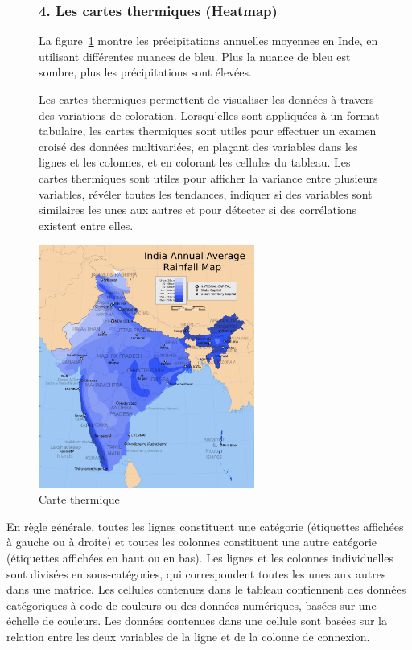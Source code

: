 \documentclass[french, a4paper, 12pt]{report}
\begin{document}
\begin{figure}[!htb]
\begin{minipage}{0.46\linewidth}

\subsubsection{4. Les cartes thermiques (Heatmap)}
La figure~\ref{fig:2.7} montre les précipitations annuelles moyennes en Inde, en utilisant différentes nuances de bleu. Plus la nuance de bleu est sombre, plus les précipitations sont élevées.

Les cartes thermiques permettent de visualiser les données à travers des variations de coloration. Lorsqu'elles sont appliquées à un format tabulaire, les cartes thermiques sont utiles pour effectuer un examen croisé des données multivariées, en plaçant des variables dans les lignes et les colonnes, et en colorant les cellules du tableau.
Les cartes thermiques sont utiles pour afficher la variance entre plusieurs variables, révéler toutes les tendances, indiquer si des variables sont similaires les unes aux autres et pour détecter si des corrélations existent entre elles.
\end{minipage}\hfil
\begin{minipage}{0.35\linewidth}
\centering
    \includegraphics[height=8cm]{images/Heatmap.png}
    \caption{Carte thermique \footnotemark}
 \label{fig:2.7}
\end{minipage}
\end{figure}

En règle générale, toutes les lignes constituent une catégorie (étiquettes affichées à gauche ou à droite) et toutes les colonnes constituent une autre catégorie (étiquettes affichées en haut ou en bas). Les lignes et les colonnes individuelles sont divisées en sous-catégories, qui correspondent toutes les unes aux autres dans une matrice. Les cellules contenues dans le tableau contiennent des données catégoriques à code de couleurs ou des données numériques, basées sur une échelle de couleurs. Les données contenues dans une cellule sont basées sur la relation entre les deux variables de la ligne et de la colonne de connexion.
\end{document}
